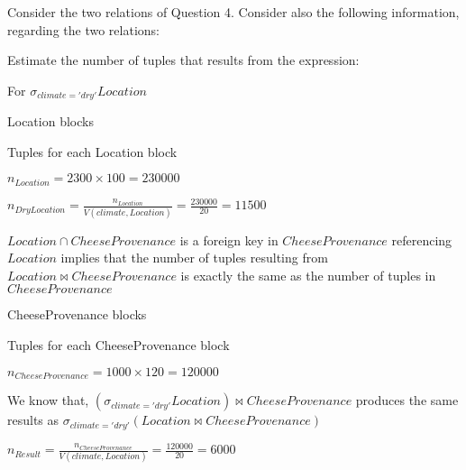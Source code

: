 {\color{gray} Consider the two relations of Question 4. Consider also the following information, regarding the two relations:}


{\color{gray} Estimate the number of tuples that results from the expression:}


For $\sigma_{climate='dry'} Location$
 
 Location blocks

 Tuples for each Location block

\tab $n_{Location} = 2300 \times 100 = 230000 $

\tab $n_{Dry Location} = \frac{n_{Location}}{ V(climate, Location)}=\frac{230000}{20} = 11500 $

$Location ∩ CheeseProvenance$ is a foreign key in $CheeseProvenance$ referencing $Location$ implies that the number of tuples resulting from $Location \bowtie CheeseProvenance$ is exactly the same as the number of tuples in $CheeseProvenance$
 
 CheeseProvenance blocks

 Tuples for each CheeseProvenance block

\tab $n_{CheeseProvenance} = 1000 \times 120 = 120000 $

We know that, $(\sigma_{climate='dry'} Location) \bowtie CheeseProvenance$ produces the same results as $\sigma_{climate='dry'} (Location \bowtie CheeseProvenance)$

\tab $n_{Result} = \frac{n_{CheeseProvenance}}{ V(climate, Location)}=\frac{120000}{20} = 6000 $


